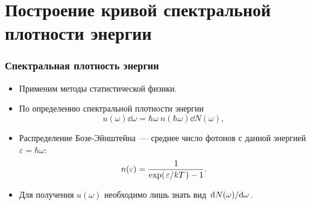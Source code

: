 \documentclass[compress]{beamer}
\begin{document}

    \section[СПЭ]{Построение кривой спектральной плотности энергии}


    \begin{frame}\frametitle{Спектральная плотность энергии}

        \begin{itemize}
            \item Применим методы статистической физики.

            \item По определению спектральной плотности энергии
            \begin{equation}\label{eq:psd}
                u(\omega) \dd{\omega} = \hbar\omega\ n(\hbar\omega) \dd{N(\omega)} ,
            \end{equation}

            \item Распределение Бозе-Эйнштейна~--- среднее число фотонов с данной энергией $\varepsilon = \hbar\omega$:
            \begin{equation}\label{eq:n_of_eps}
                n(\varepsilon) = \frac{1}{\exp(\flatfrac{\varepsilon}{kT}) - 1} .
            \end{equation}

            \item Для получения $u(\omega)$ необходимо лишь знать вид $\dv*{N(\omega)}{\omega}$.

        \end{itemize}

    \end{frame}

\end{document}
